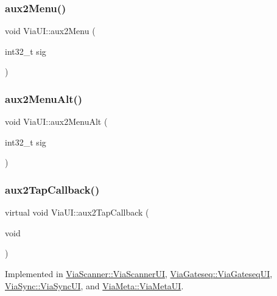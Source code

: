 \mbox{\label{class_via_u_i_a928f20f199d42ce05487d5ed7bffd574}} 
\subsubsection{\texorpdfstring{aux2\+Menu()}{aux2Menu()}}
{\footnotesize\ttfamily void Via\+U\+I\+::aux2\+Menu (\begin{DoxyParamCaption}\item[{int32\+\_\+t}]{sig }\end{DoxyParamCaption})}

\mbox{\label{class_via_u_i_adf31f9ee348422bc4536f5fc1ef401a4}} 
\subsubsection{\texorpdfstring{aux2\+Menu\+Alt()}{aux2MenuAlt()}}
{\footnotesize\ttfamily void Via\+U\+I\+::aux2\+Menu\+Alt (\begin{DoxyParamCaption}\item[{int32\+\_\+t}]{sig }\end{DoxyParamCaption})}

\mbox{\label{class_via_u_i_ae5e009dc22002f62e6bff8dd76d2f745}} 
\subsubsection{\texorpdfstring{aux2\+Tap\+Callback()}{aux2TapCallback()}}
{\footnotesize\ttfamily virtual void Via\+U\+I\+::aux2\+Tap\+Callback (\begin{DoxyParamCaption}\item[{void}]{ }\end{DoxyParamCaption})\hspace{0.3cm}{\ttfamily [pure virtual]}}



Implemented in \mbox{\hyperlink{class_via_scanner_1_1_via_scanner_u_i_a7d3aad2399479925618df242bc5b1f42}{Via\+Scanner\+::\+Via\+Scanner\+UI}}, \mbox{\hyperlink{class_via_gateseq_1_1_via_gateseq_u_i_a8e700657f1fe190238eca7c46541337b}{Via\+Gateseq\+::\+Via\+Gateseq\+UI}}, \mbox{\hyperlink{class_via_sync_1_1_via_sync_u_i_a117e57feaf74b2619c1506aacc421721}{Via\+Sync\+::\+Via\+Sync\+UI}}, and \mbox{\hyperlink{class_via_meta_1_1_via_meta_u_i_a2d1e0164ad7d84c410cc90cefe9730ce}{Via\+Meta\+::\+Via\+Meta\+UI}}.

